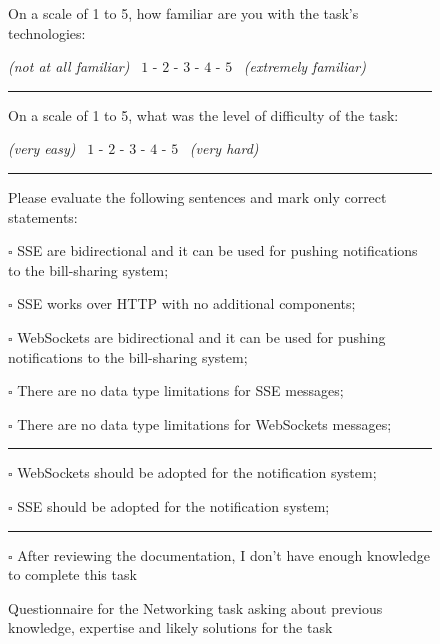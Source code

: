 \begin{figure}
\begin{mdframed}[backgroundcolor=gray!15] 
\begin{scriptsize}

\noindent On a scale of 1 to 5, how familiar are you with the task's technologies: \smallskip

\quad \textit{(not at all familiar)} ~$1$ - $2$ - $3$ - $4$ - $5$ ~\textit{(extremely familiar)} 

\noindent\rule{8cm}{0.4pt} \smallskip

\noindent On a scale of 1 to 5, what was the level of difficulty of the task: \smallskip

\quad \textit{(very easy)} ~$1$ - $2$ - $3$ - $4$ - $5$ ~\textit{(very hard)} 

\noindent\rule{8cm}{0.4pt} \smallskip

\noindent Please evaluate the following sentences and mark only correct statements: \smallskip

\noindent $\square$ SSE are bidirectional and it can be used for pushing notifications to the bill-sharing system; \smallskip

\noindent $\square$ SSE works over HTTP with no additional components; \smallskip
    
\noindent $\square$ WebSockets are bidirectional and it can be used for pushing notifications to the bill-sharing system; \smallskip
    
\noindent $\square$ There are no data type limitations for SSE messages; \smallskip
    
\noindent $\square$ There are no data type limitations for WebSockets messages; \smallskip

\noindent\rule{8cm}{0.4pt} \smallskip

\noindent $\square$ WebSockets should be adopted for the notification system; \smallskip

\noindent $\square$ SSE should be adopted for the notification system; \smallskip

\noindent\rule{8cm}{0.4pt} \smallskip

\noindent $\square$ After reviewing the documentation, I don't have enough knowledge to complete this task

\end{scriptsize}
\end{mdframed}
\caption{Questionnaire for the Networking task asking about previous knowledge, expertise and likely solutions for the task}
\label{fig:networking-questions}
\end{figure}

    
